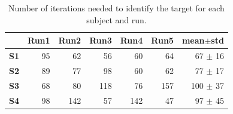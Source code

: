 \documentclass[]{article}
\newcommand{\sectionspace}{\vspace{-0.3cm}}
\newcommand{\plotspace}{\vspace{-0.25cm}}
\begin{document}
\begin{table}[!ht]
\centering
\begin{footnotesize}
\begin{tabular}{r|rrrrr|r}
    & \textbf{Run1} & \textbf{Run2} & \textbf{Run3} & \textbf{Run4} & \textbf{Run5} & \textbf{mean$\pm$std} \\\hline
    \textbf{S1} & 95 & 62 & 56 & 60 & 64 & 67 $\pm$ 16 \\
    \textbf{S2} & 89 & 77 & 98 & 60 & 62  & 77 $\pm$ 17 \\
    \textbf{S3} & 68 & 80 & 118 & 76 & 157 & 100 $\pm$ 37 \\
    \textbf{S4} & 98 & 142 & 57 & 142 & 47 & 97 $\pm$ 45 \\
\end{tabular}
\end{footnotesize}
  \caption{Number of iterations needed to identify the target for each subject and run. \plotspace}
  \label{ch6tab:steps}
\end{table}




\sectionspace

\begin{footnotesize}


\end{footnotesize}
\end{document}
